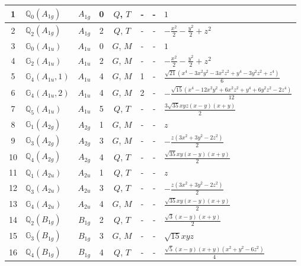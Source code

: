 \documentclass[fleqn,10pt,landscape]{jsarticle}
\begin{document}
\begin{longtable}[l]{clcccccl}
1 & $\mathbb{Q}_{0}(A_{1g})$ & $A_{1g}$ & 0 & $Q$, $T$ & - & - & $1$ \\ \hline
2 & $\mathbb{Q}_{2}(A_{1g})$ & $A_{1g}$ & 2 & $Q$, $T$ & - & - & $- \frac{x^{2}}{2} - \frac{y^{2}}{2} + z^{2}$ \\ \hline
3 & $\mathbb{G}_{0}(A_{1u})$ & $A_{1u}$ & 0 & $G$, $M$ & - & - & $1$ \\ \hline
4 & $\mathbb{G}_{2}(A_{1u})$ & $A_{1u}$ & 2 & $G$, $M$ & - & - & $- \frac{x^{2}}{2} - \frac{y^{2}}{2} + z^{2}$ \\ \hline
5 & $\mathbb{G}_{4}(A_{1u},1)$ & $A_{1u}$ & 4 & $G$, $M$ & 1 & - & $\frac{\sqrt{21} \left(x^{4} - 3 x^{2} y^{2} - 3 x^{2} z^{2} + y^{4} - 3 y^{2} z^{2} + z^{4}\right)}{6}$ \\ \hline
6 & $\mathbb{G}_{4}(A_{1u},2)$ & $A_{1u}$ & 4 & $G$, $M$ & 2 & - & $- \frac{\sqrt{15} \left(x^{4} - 12 x^{2} y^{2} + 6 x^{2} z^{2} + y^{4} + 6 y^{2} z^{2} - 2 z^{4}\right)}{12}$ \\ \hline
7 & $\mathbb{Q}_{5}(A_{1u})$ & $A_{1u}$ & 5 & $Q$, $T$ & - & - & $\frac{3 \sqrt{35} x y z \left(x - y\right) \left(x + y\right)}{2}$ \\ \hline
8 & $\mathbb{G}_{1}(A_{2g})$ & $A_{2g}$ & 1 & $G$, $M$ & - & - & $z$ \\ \hline
9 & $\mathbb{G}_{3}(A_{2g})$ & $A_{2g}$ & 3 & $G$, $M$ & - & - & $- \frac{z \left(3 x^{2} + 3 y^{2} - 2 z^{2}\right)}{2}$ \\ \hline
10 & $\mathbb{Q}_{4}(A_{2g})$ & $A_{2g}$ & 4 & $Q$, $T$ & - & - & $\frac{\sqrt{35} x y \left(x - y\right) \left(x + y\right)}{2}$ \\ \hline
11 & $\mathbb{Q}_{1}(A_{2u})$ & $A_{2u}$ & 1 & $Q$, $T$ & - & - & $z$ \\ \hline
12 & $\mathbb{Q}_{3}(A_{2u})$ & $A_{2u}$ & 3 & $Q$, $T$ & - & - & $- \frac{z \left(3 x^{2} + 3 y^{2} - 2 z^{2}\right)}{2}$ \\ \hline
13 & $\mathbb{G}_{4}(A_{2u})$ & $A_{2u}$ & 4 & $G$, $M$ & - & - & $\frac{\sqrt{35} x y \left(x - y\right) \left(x + y\right)}{2}$ \\ \hline
14 & $\mathbb{Q}_{2}(B_{1g})$ & $B_{1g}$ & 2 & $Q$, $T$ & - & - & $\frac{\sqrt{3} \left(x - y\right) \left(x + y\right)}{2}$ \\ \hline
15 & $\mathbb{G}_{3}(B_{1g})$ & $B_{1g}$ & 3 & $G$, $M$ & - & - & $\sqrt{15} x y z$ \\ \hline
16 & $\mathbb{Q}_{4}(B_{1g})$ & $B_{1g}$ & 4 & $Q$, $T$ & - & - & $\frac{\sqrt{5} \left(x - y\right) \left(x + y\right) \left(x^{2} + y^{2} - 6 z^{2}\right)}{4}$ \\ \hline

\end{longtable}
\end{document}
